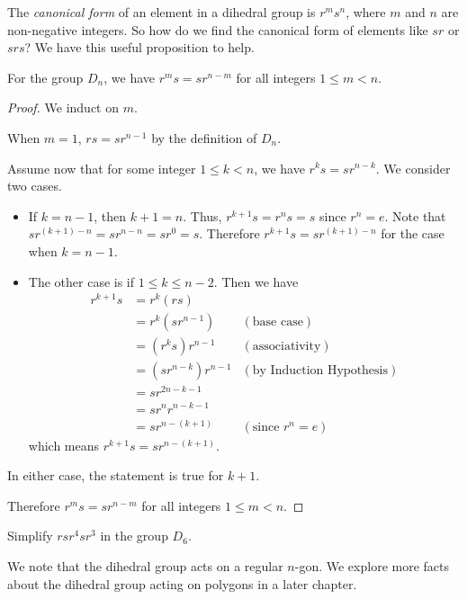 The \textit{canonical form} of an element in a dihedral group is $r^ms^n$, where $m$ and $n$ are non-negative integers. So how do we find the canonical form of elements like $sr$ or $srs$? We have this useful proposition to help.
\begin{proposition}
    For the group $D_n$, we have $r^ms = sr^{n-m}$ for all integers $1 \leq m < n$.
\end{proposition}
\begin{proof}
    We induct on $m$.
    
    When $m = 1$, $rs = sr^{n-1}$ by the definition of $D_n$.
    
    Assume now that for some integer $1 \leq k < n$, we have $r^ks = sr^{n-k}$. We consider two cases.
    \begin{itemize}
        \item If $k = n - 1$, then $k + 1 = n$. Thus, $r^{k+1}s = r^ns = s$ since $r^n = e$. Note that $sr^{(k+1)-n} = sr^{n-n} = sr^0 = s$. Therefore $r^{k+1}s = sr^{(k+1)-n}$ for the case when $k = n - 1$.
        \item The other case is if $1 \leq k \leq n - 2$. Then we have
        \begin{align*}
            r^{k+1}s &= r^k(rs)\\
            &= r^k(sr^{n-1}) & (\text{base case})\\
            &= (r^ks)r^{n-1} & (\text{associativity})\\
            &= (sr^{n-k})r^{n-1} & (\text{by Induction Hypothesis})\\
            &= sr^{2n - k - 1}\\
            &= sr^nr^{n-k-1}\\
            &= sr^{n-(k+1)} & (\text{since } r^n = e)
        \end{align*}
        which means $r^{k+1}s = sr^{n-(k+1)}$.
    \end{itemize}
    In either case, the statement is true for $k+1$.
    
    Therefore $r^ms = sr^{n-m}$ for all integers $1 \leq m < n$.
\end{proof}

\begin{exercise}
    Simplify $rsr^4sr^3$ in the group $D_6$.
\end{exercise}

We note that the dihedral group acts on a regular $n$-gon. We explore more facts about the dihedral group acting on polygons in a later chapter.

